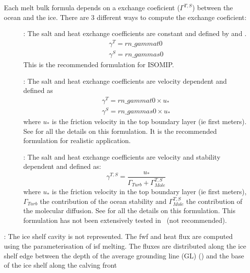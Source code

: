 \documentclass[../main/NEMO_manual]{subfiles}
\begin{document}
\begin{description}
  Each melt bulk formula depends on a exchange coeficient ($\Gamma^{T,S}$) between the ocean and the ice.
  There are 3 different ways to compute the exchange coeficient:
  \begin{description}
  \item [{}]: The salt and heat exchange coefficients are constant and defined by  and .
    \begin{gather*}
      \gamma^{T} = rn\_gammat0 \\
      \gamma^{S} = rn\_gammas0
    \end{gather*}
    This is the recommended formulation for ISOMIP.
  \item [{}]: The salt and heat exchange coefficients are velocity dependent and defined as
    \begin{gather*}
      \gamma^{T} = rn\_gammat0 \times u_{*} \\
      \gamma^{S} = rn\_gammas0 \times u_{*}
    \end{gather*}
    where $u_{*}$ is the friction velocity in the top boundary layer (ie first  meters).
    See \citet{jenkins.nicholls.ea_JPO10} for all the details on this formulation. It is the recommended formulation for realistic application.
  \item [{}]: The salt and heat exchange coefficients are velocity and stability dependent and defined as:
    \[
      \gamma^{T,S} = \frac{u_{*}}{\Gamma_{Turb} + \Gamma^{T,S}_{Mole}}
    \]
    where $u_{*}$ is the friction velocity in the top boundary layer (ie first  meters),
    $\Gamma_{Turb}$ the contribution of the ocean stability and
    $\Gamma^{T,S}_{Mole}$ the contribution of the molecular diffusion.
    See \citet{holland.jenkins_JPO99} for all the details on this formulation.
    This formulation has not been extensively tested in \NEMO\ (not recommended).
  \end{description}
\item [{\np[=2]{nn_isf}{nn\_isf}}]: The ice shelf cavity is not represented.
  The fwf and heat flux are computed using the \citet{beckmann.goosse_OM03} parameterisation of isf melting.
  The fluxes are distributed along the ice shelf edge between the depth of the average grounding line (GL)
  () and the base of the ice shelf along the calving front

\end{description}
\end{document}
